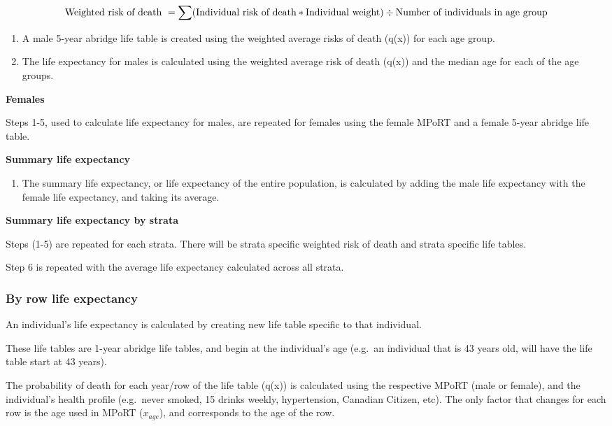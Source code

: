 \documentclass[]{book}
\providecommand{\tightlist}{%
  \setlength{\itemsep}{0pt}\setlength{\parskip}{0pt}}
\begin{document}
\[ \text{Weighted risk of death } = \sum(\text{Individual risk of death}*\text{Individual weight}) \\ \div \text{Number of individuals in age group}\]

\begin{enumerate}
\def\labelenumi{\arabic{enumi}.}
\setcounter{enumi}{3}
\item
  A male 5-year abridge life table is created using the weighted average
  risks of death (q(x)) for each age group.
\item
  The life expectancy for males is calculated using the weighted average
  risk of death (q(x)) and the median age for each of the age groups.
\end{enumerate}

\textbf{Females}

Steps 1-5, used to calculate life expectancy for males, are repeated for
females using the female MPoRT and a female 5-year abridge life table.

\textbf{Summary life expectancy}

\begin{enumerate}
\def\labelenumi{\arabic{enumi}.}
\setcounter{enumi}{5}
\tightlist
\item
  The summary life expectancy, or life expectancy of the entire
  population, is calculated by adding the male life expectancy with the
  female life expectancy, and taking its average.
\end{enumerate}

\textbf{Summary life expectancy by strata}

Steps (1-5) are repeated for each strata. There will be strata specific
weighted risk of death and strata specific life tables.

Step 6 is repeated with the average life expectancy calculated across
all strata.

\subsubsection{By row life expectancy}\label{by-row-life-expectancy}

An individual's life expectancy is calculated by creating new life table
specific to that individual.

These life tables are 1-year abridge life tables, and begin at the
individual's age (e.g.~an individual that is 43 years old, will have the
life table start at 43 years).

The probability of death for each year/row of the life table (q(x)) is
calculated using the respective MPoRT (male or female), and the
individual's health profile (e.g.~never smoked, 15 drinks weekly,
hypertension, Canadian Citizen, etc). The only factor that changes for
each row is the age used in MPoRT (\(x_{age}\)), and corresponds to the
age of the row.
\end{document}

